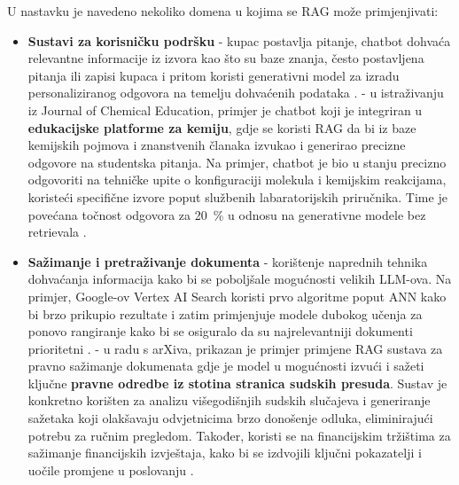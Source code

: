 \documentclass[]{foi}
\begin{document}
U nastavku je navedeno nekoliko domena u kojima se RAG može primjenjivati:

\begin{itemize}
    \item \textbf{Sustavi za korisničku podršku} - kupac postavlja pitanje, chatbot dohvaća relevantne informacije iz izvora kao što su baze znanja,
    često postavljena pitanja ili zapisi kupaca i pritom koristi generativni model za izradu personaliziranog odgovora na temelju dohvaćenih podataka \cite{nishtha2025rag}.
    \subitem - u istraživanju iz Journal of Chemical Education, primjer je chatbot koji je integriran u \textbf{edukacijske platforme za kemiju}, gdje se koristi RAG da bi iz baze kemijskih pojmova 
    i znanstvenih članaka izvukao i generirao precizne odgovore na studentska pitanja. Na primjer, chatbot je bio u stanju precizno odgovoriti na tehničke upite o konfiguraciji molekula
    i kemijskim reakcijama, koristeći specifične izvore poput službenih labaratorijskih priručnika. Time je povećana točnost odgovora za 20 \,\% u odnosu na generativne modele bez retrievala \cite{Cooper2024}.

    \item \textbf{Sažimanje i pretraživanje dokumenta} - korištenje naprednih tehnika dohvaćanja informacija kako bi se poboljšale mogućnosti velikih LLM-ova.
    Na primjer, Google-ov Vertex AI Search koristi prvo algoritme poput ANN kako bi brzo prikupio rezultate i zatim primjenjuje modele dubokog učenja za ponovo 
    rangiranje kako bi se osiguralo da su najrelevantniji dokumenti prioritetni \cite{nishtha2025rag}.
    \subitem - u radu s arXiva, prikazan je primjer primjene RAG sustava za pravno sažimanje dokumenata gdje je model u mogućnosti izvući i sažeti ključne \textbf{pravne odredbe iz stotina stranica
    sudskih presuda}. Sustav je konkretno korišten za analizu višegodišnjih sudskih slučajeva i generiranje sažetaka koji olakšavaju odvjetnicima brzo donošenje odluka, eliminirajući potrebu
    za ručnim pregledom. Također, koristi se na financijskim tržištima za sažimanje financijskih izvještaja, kako bi se izdvojili ključni pokazatelji i uočile promjene u poslovanju \cite{Shengjie2024}.


\end{itemize}
\end{document}
